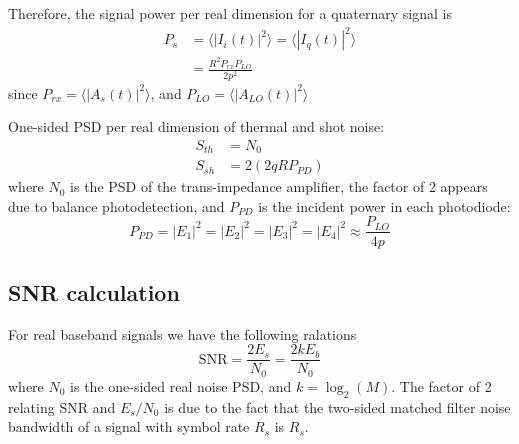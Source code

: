 \documentclass[a4paper]{article}
\begin{document}
Therefore, the signal power per real dimension for a quaternary signal is
\begin{align} \nonumber
P_{s} &= \langle|I_i(t)|^2\rangle = \langle|I_q(t)|^2\rangle \\
&= \frac{R^2P_{rx}P_{LO}}{2p^2}
\end{align}
since $P_{rx} = \langle|A_s(t)|^2\rangle$, and $P_{LO} = \langle|A_{LO}(t)|^2\rangle$

One-sided PSD per real dimension of thermal and shot noise:
\begin{align}
S_{th} &= N_0 \\
S_{sh} &= 2(2qRP_{PD})
\end{align}
where $N_0$ is the PSD of the trans-impedance amplifier, the factor of 2 appears due to balance photodetection, and $P_{PD}$ is the incident power in each photodiode:
\begin{equation}
P_{PD} = |E_1|^2 = |E_2|^2 = |E_3|^2 = |E_4|^2 \approx \frac{P_{LO}}{4p}
\end{equation}

%
%
%
%

\subsection{SNR calculation}
For real baseband signals we have the following ralations
\begin{equation}
\mathrm{SNR} = \frac{2E_s}{N_0} = \frac{2kE_b}{N_0}
\end{equation}
where $N_0$ is the one-sided real noise PSD, and $k = \log_2(M)$. The factor of 2 relating SNR and $E_s/N_0$ is due to the fact that the two-sided matched filter noise bandwidth of a signal with symbol rate $R_s$ is $R_s$.
\end{document}
